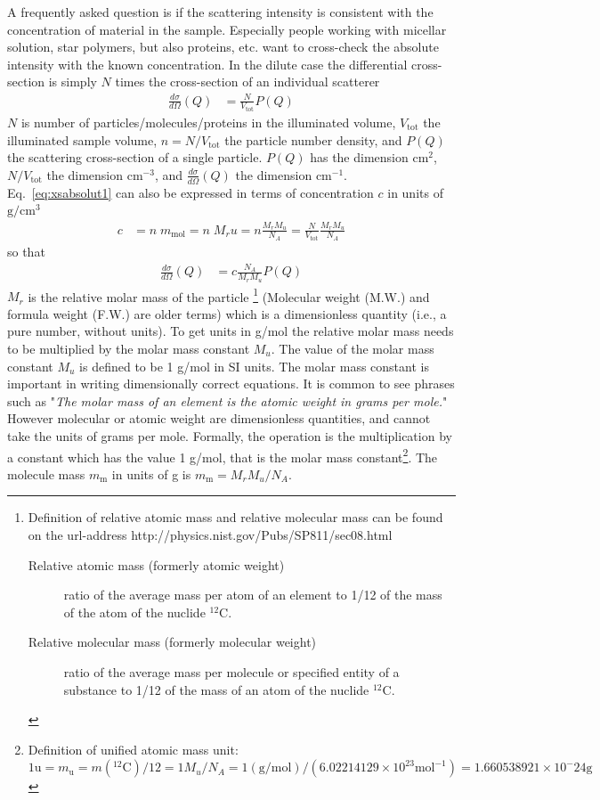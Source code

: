 A frequently asked question is if the scattering intensity is consistent
with the concentration of material in the sample. Especially people working with micellar solution,
star polymers, but also proteins, etc. want to cross-check the absolute intensity with the known concentration.
In the dilute case the differential cross-section is simply $N$ times the cross-section of an individual scatterer
\begin{align}
\frac{d\sigma}{d\Omega}(Q) &= \frac{N}{V_\text{tot}} P(Q)
\label{eq:xsabsolut1}
\end{align}
$N$ is number of particles/molecules/proteins in the illuminated volume,
$V_\text{tot}$ the illuminated sample volume,
$n=N/V_\text{tot}$ the particle number density,
and $P(Q)$ the scattering cross-section of a single particle.
$P(Q)$ has the dimension cm$^{2}$, $N/V_\text{tot}$ the dimension cm$^{-3}$,
and $\frac{d\sigma}{d\Omega}(Q)$ the dimension cm$^{-1}$. Eq.\ \ref{eq:xsabsolut1}
can also be expressed in terms of concentration $c$ in units of $\mathrm{g}/\mathrm{cm}^3$
\begin{align}
c &= n\; m_\text{mol} = n\; M_r u = n\frac{M_rM_u}{N_A} =
\frac{N}{V_\text{tot}}\frac{M_r M_u}{N_A}
\end{align}
so that
\begin{align}
\frac{d\sigma}{d\Omega}(Q) &= c\frac{N_A}{M_r M_u} P(Q)
\label{eq:xsabsolut2}
\end{align}
$M_r$ is the relative molar mass of the particle
\footnote{
Definition of relative atomic mass and relative molecular mass can be found on the url-address
http://physics.nist.gov/Pubs/SP811/sec08.html
\begin{description}
\item[Relative atomic mass (formerly atomic weight)] ratio of the average mass per atom of an element to 1/12 of the mass of the atom of the nuclide $^{12}$C.
\item[Relative molecular mass (formerly molecular weight)] ratio of the average mass per molecule or specified entity of a substance to 1/12 of the mass of an atom of the nuclide $^{12}$C.
\end{description}
}
 (Molecular weight (M.W.) and formula weight (F.W.) are older terms) which is a
dimensionless quantity (i.e., a pure number, without units). To get
units in g/mol the relative molar mass needs to be multiplied by the
molar mass constant $M_u$.
The value of the molar mass constant $M_u$ is defined to be 1 g/mol in SI
units. The molar mass constant is important in writing
dimensionally correct equations. It is common to see phrases such
as "\emph{The molar mass of an element is the atomic weight in
grams per mole.}" However molecular or atomic weight are
dimensionless quantities, and cannot take the units of grams per
mole. Formally, the operation is the multiplication by a constant
which has the value 1 g/mol, that is the molar mass
constant\footnote{Definition of unified atomic mass unit: $1 \mathrm{u} = m_{\mathrm{u}} = m\left({}^{12}\mathrm{C}\right) / 12 = 1M_u/N_A=1\left(\mathrm{g}/\mathrm{mol}\right) / \left(6.02214129\times 10^{23} \mathrm{mol}^{-1}\right)=1.660538921\times 10^-{24}\mathrm{g}$}.
The molecule mass $m_\text{m}$ in units of g is $m_\text{m}=M_r M_u/N_A$.

